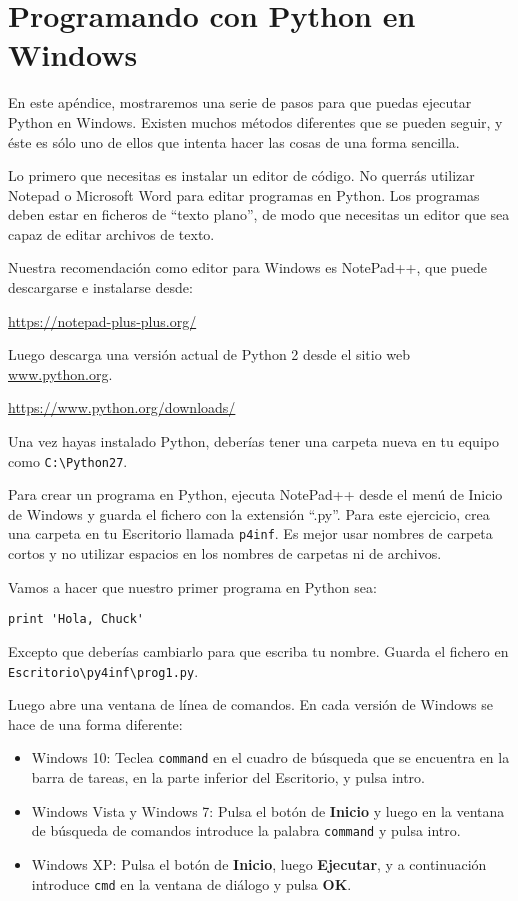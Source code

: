 
\chapter{Programando con Python en Windows}

En este apéndice, mostraremos una serie de pasos
para que puedas ejecutar Python en Windows. Existen muchos métodos
diferentes que se pueden seguir, y éste es sólo uno de ellos
que intenta hacer las cosas de una forma sencilla.

Lo primero que necesitas es instalar un editor de código. No
querrás utilizar Notepad o Microsoft Word para editar
programas en Python. Los programas deben estar en ficheros de ``texto plano'',
de modo que necesitas un editor que sea capaz de
editar archivos de texto.

Nuestra recomendación como editor para Windows es NotePad++, que
puede descargarse e instalarse desde:

\url{https://notepad-plus-plus.org/}

Luego descarga una versión actual de Python 2 desde el
sitio web \url{www.python.org}.

\url{https://www.python.org/downloads/}

Una vez hayas instalado Python, deberías tener una
carpeta nueva en tu equipo como {\tt C:{\textbackslash}Python27}.

Para crear un programa en Python, ejecuta NotePad++ desde el menú de Inicio de Windows
y guarda el fichero con la extensión ``.py''. Para este
ejercicio, crea una carpeta en tu Escritorio llamada
{\tt p4inf}. Es mejor usar nombres de carpeta cortos
y no utilizar espacios en los nombres de carpetas ni de archivos.

Vamos a hacer que nuestro primer programa en Python sea:

\beforeverb
\begin{verbatim}
print 'Hola, Chuck'
\end{verbatim}
\afterverb
%
Excepto que deberías cambiarlo para que escriba tu nombre. Guarda el fichero
en {\tt Escritorio{\textbackslash}py4inf{\textbackslash}prog1.py}.

Luego abre una ventana de línea de comandos. En cada versión de Windows
se hace de una forma diferente:

\begin{itemize}
\item Windows 10: Teclea {\tt command} en el cuadro de búsqueda
que se encuentra en la barra de tareas, en la parte inferior del Escritorio,
y pulsa intro.
	
\item Windows Vista y Windows 7: Pulsa el botón de {\bf Inicio}
y luego en la ventana de búsqueda de comandos introduce la palabra
{\tt command} y pulsa intro.

\item Windows XP: Pulsa el botón de {\bf Inicio}, luego {\bf Ejecutar}, y
a continuación introduce {\tt cmd} en la ventana de diálogo y pulsa {\bf OK}.
\end{itemize}

